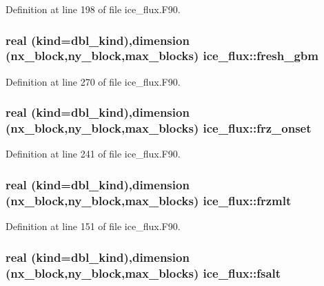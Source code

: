Definition at line 198 of file ice\_\-flux.F90.\hypertarget{namespaceice__flux_a962d1e42294e09b10fb22bc3554aa71b}{
\subsubsection[{fresh\_\-gbm}]{\setlength{\rightskip}{0pt plus 5cm}real (kind=dbl\_\-kind),dimension (nx\_\-block,ny\_\-block,max\_\-blocks) {\bf ice\_\-flux::fresh\_\-gbm}}}
\label{namespaceice__flux_a962d1e42294e09b10fb22bc3554aa71b}


Definition at line 270 of file ice\_\-flux.F90.\hypertarget{namespaceice__flux_aa58df919e95f30bf2b824e6585dbd9e5}{
\subsubsection[{frz\_\-onset}]{\setlength{\rightskip}{0pt plus 5cm}real (kind=dbl\_\-kind),dimension (nx\_\-block,ny\_\-block,max\_\-blocks) {\bf ice\_\-flux::frz\_\-onset}}}
\label{namespaceice__flux_aa58df919e95f30bf2b824e6585dbd9e5}


Definition at line 241 of file ice\_\-flux.F90.\hypertarget{namespaceice__flux_af09eb2a499606f27cd8ba847a999df71}{
\subsubsection[{frzmlt}]{\setlength{\rightskip}{0pt plus 5cm}real (kind=dbl\_\-kind),dimension (nx\_\-block,ny\_\-block,max\_\-blocks) {\bf ice\_\-flux::frzmlt}}}
\label{namespaceice__flux_af09eb2a499606f27cd8ba847a999df71}


Definition at line 151 of file ice\_\-flux.F90.\hypertarget{namespaceice__flux_a93da98d35da9e23e802edb93bcaf7477}{
\subsubsection[{fsalt}]{\setlength{\rightskip}{0pt plus 5cm}real (kind=dbl\_\-kind),dimension (nx\_\-block,ny\_\-block,max\_\-blocks) {\bf ice\_\-flux::fsalt}}}
\label{namespaceice__flux_a93da98d35da9e23e802edb93bcaf7477}



